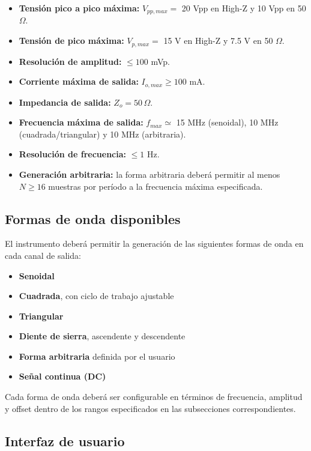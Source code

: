 \begin{itemize}
	\item \textbf{Tensión pico a pico máxima:} $V_{pp,max} =$ 20 Vpp en High-Z y 10 Vpp en 50 $\Omega$.
	\item \textbf{Tensión de pico máxima:} $V_{p,max} =$ 15 V en High-Z y 7.5 V en 50 $\Omega$.
	\item \textbf{Resolución de amplitud:} $\leq 100$ mVp.
	\item \textbf{Corriente máxima de salida:} $I_{o,max} \geq 100$ mA.
	\item \textbf{Impedancia de salida:} $Z_o = 50\,\Omega$.
	\item \textbf{Frecuencia máxima de salida:} $f_{max} \simeq$ 15 MHz (senoidal), 10 MHz (cuadrada/triangular) y 10 MHz (arbitraria).
	\item \textbf{Resolución de frecuencia:} $\leq 1$ Hz.
	\item \textbf{Generación arbitraria:} la forma arbitraria deberá permitir al menos $N \ge 16$ muestras por período a la frecuencia máxima especificada.
\end{itemize}

\subsection{Formas de onda disponibles}
El instrumento deberá permitir la generación de las siguientes formas de onda en cada canal de salida:

\begin{itemize}
	\item \textbf{Senoidal}
	\item \textbf{Cuadrada}, con ciclo de trabajo ajustable
	\item \textbf{Triangular}
	\item \textbf{Diente de sierra}, ascendente y descendente
	\item \textbf{Forma arbitraria} definida por el usuario
	\item \textbf{Señal continua (DC)}
\end{itemize}

Cada forma de onda deberá ser configurable en términos de frecuencia, amplitud y offset dentro de los rangos especificados en las subsecciones correspondientes.

\subsection{Interfaz de usuario}

